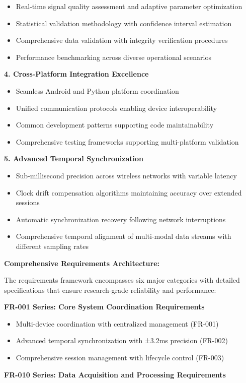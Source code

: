 \documentclass[11pt,a4paper]{report}
\begin{document}
\begin{itemize}
\item Real-time signal quality assessment and adaptive parameter optimization
\item Statistical validation methodology with confidence interval estimation
\item Comprehensive data validation with integrity verification procedures
\item Performance benchmarking across diverse operational scenarios

\end{itemize}
\textbf{4. Cross-Platform Integration Excellence}

\begin{itemize}
\item Seamless Android and Python platform coordination
\item Unified communication protocols enabling device interoperability
\item Common development patterns supporting code maintainability
\item Comprehensive testing frameworks supporting multi-platform validation

\end{itemize}
\textbf{5. Advanced Temporal Synchronization}

\begin{itemize}
\item Sub-millisecond precision across wireless networks with variable latency
\item Clock drift compensation algorithms maintaining accuracy over extended sessions
\item Automatic synchronization recovery following network interruptions
\item Comprehensive temporal alignment of multi-modal data streams with different sampling rates

\end{itemize}
\textbf{Comprehensive Requirements Architecture:}

The requirements framework encompasses six major categories with detailed specifications that ensure research-grade
reliability and performance:

\textbf{FR-001 Series: Core System Coordination Requirements}

\begin{itemize}
\item Multi-device coordination with centralized management (FR-001)
\item Advanced temporal synchronization with ±3.2ms precision (FR-002)
\item Comprehensive session management with lifecycle control (FR-003)

\end{itemize}
\textbf{FR-010 Series: Data Acquisition and Processing Requirements}
\end{document}

